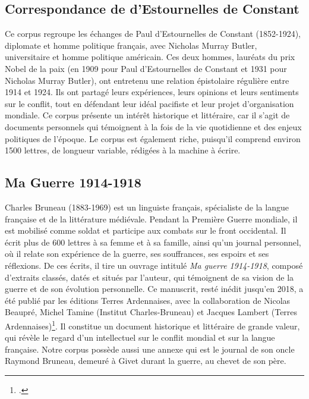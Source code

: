 \subsection{Correspondance de d'Estournelles de Constant}

Ce corpus regroupe les échanges de Paul d’Estournelles de Constant (1852-1924), diplomate et homme politique français, avec Nicholas Murray Butler, universitaire et homme politique américain. Ces deux hommes, lauréats du prix Nobel de la paix (en 1909 pour Paul d’Estournelles de Constant et 1931 pour Nicholas Murray Butler), ont entretenu une relation épistolaire régulière entre 1914 et 1924. Ils ont partagé leurs expériences, leurs opinions et leurs sentiments sur le conflit, tout en défendant leur idéal pacifiste et leur projet d’organisation mondiale. Ce corpus présente un intérêt historique et littéraire, car il s’agit de documents personnels qui témoignent à la fois de la vie quotidienne et des enjeux politiques de l’époque. Le corpus est également riche, puisqu’il comprend environ 1500 lettres, de longueur variable, rédigées à la machine à écrire.

\subsection{Ma Guerre 1914-1918}

Charles Bruneau (1883-1969) est un linguiste français, spécialiste de la langue française et de la littérature médiévale. Pendant la Première Guerre mondiale, il est mobilisé comme soldat et participe aux combats sur le front occidental. Il écrit plus de 600 lettres à sa femme et à sa famille, ainsi qu’un journal personnel, où il relate son expérience de la guerre, ses souffrances, ses espoirs et ses réflexions. De ces écrits, il tire un ouvrage intitulé \textit{Ma guerre 1914-1918}, composé d’extraits classés, datés et situés par l’auteur, qui témoignent de sa vision de la guerre et de son évolution personnelle. Ce manuscrit, resté inédit jusqu’en 2018, a été publié par les éditions Terres Ardennaises, avec la collaboration de Nicolas Beaupré, Michel Tamine (Institut Charles-Bruneau) et Jacques Lambert (Terres Ardennaises)\footcite{MaGuerre19141918}. Il constitue un document historique et littéraire de grande valeur, qui révèle le regard d’un intellectuel sur le conflit mondial et sur la langue française. Notre corpus possède aussi une annexe qui est le journal de son oncle Raymond Bruneau, demeuré à Givet durant la guerre, au chevet de son père.

